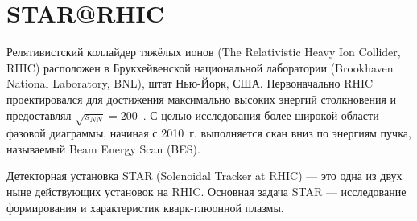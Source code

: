 
\section{STAR@RHIC}


Релятивистский коллайдер тяжёлых ионов (The Relativistic Heavy Ion Collider, RHIC) расположен в Брукхейвенской национальной лаборатории (Brookhaven National Laboratory, BNL), штат Нью-Йорк, США. Первоначально RHIC проектировался для достижения максимально высоких энергий столкновения и предоставлял $\sqrt{s_{NN}}=200$~\GeVperNucl. С целью исследования более широкой области фазовой диаграммы, начиная с 2010~г. выполняется скан вниз по энергиям пучка, называемый Beam Energy Scan (BES).

Детекторная установка STAR (Solenoidal Tracker at RHIC) --- это одна из двух ныне действующих установок на RHIC. Основная задача STAR --- исследование формирования и характеристик кварк-глюонной плазмы.


